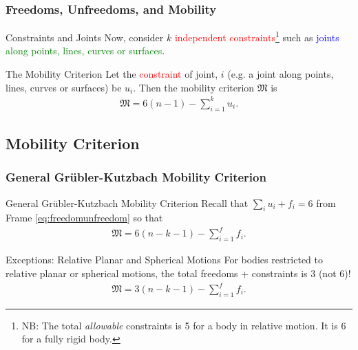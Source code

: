 \begin{frame}
	\frametitle{Freedoms, Unfreedoms, and Mobility}
	\begin{block}{Constraints and Joints}
		Now, consider $k$ \textcolor{red}{independent constraints}\footnote{NB: The total \textit{allowable} constraints is 5 for a body in relative motion. It is 6 for a fully rigid body.} such as \textcolor{blue}{joints} \textcolor{green}{along points, lines, curves or surfaces}.
	\end{block}
	
	\begin{block}{The Mobility Criterion}
		Let the \textcolor{red}{constraint} of joint, $i$ (e.g. a joint along points, lines, curves or surfaces) be $u_i$. Then the mobility criterion $\mathfrak{M}$ is
		\begin{align}
			\mathfrak{M}=6(n-1) - \sum_{i=1}^{k}u_i.
		\end{align}
	\end{block}
\end{frame}

\subsection{Mobility Criterion}
\begin{frame}
	\frametitle{ General Gr{\"u}bler-Kutzbach Mobility Criterion}	
	\begin{block}{ General Gr{\"u}bler-Kutzbach Mobility Criterion}
		Recall that $\sum_i u_i + f_i = 6$ from Frame \eqref{eq:freedomunfreedom} so that 
		\begin{align}
			\mathfrak{M}=6(n-k-1) - \sum_{i=1}^{f}f_i.
			\label{grubler}
		\end{align}
	\end{block}
	
	\begin{block}{Exceptions: Relative Planar and Spherical Motions}
		For bodies restricted to relative planar or spherical  motions, the total freedoms + constraints is 3 (not 6)! %
		\begin{align}
			\mathfrak{M}=3(n-k-1) - \sum_{i=1}^{f}f_i.
			\label{grubler}
		\end{align}
	\end{block}
\end{frame}

